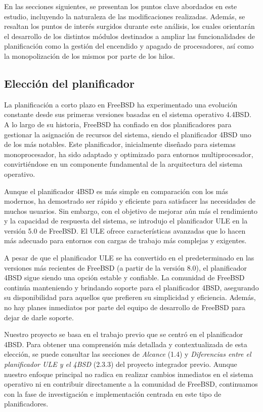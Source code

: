 En las secciones siguientes, se presentan los puntos clave abordados en este estudio, incluyendo la naturaleza de las modificaciones realizadas. Además, se resaltan los puntos de interés surgidos durante este análisis, los cuales orientarán el desarrollo de los distintos módulos destinados a ampliar las funcionalidades de planificación como la gestión del encendido y apagado de procesadores, así como la monopolización de los mismos por parte de los hilos.\par

\subsection{Elección del planificador}

La planificación a corto plazo en FreeBSD ha experimentado una evolución constante desde sus primeras versiones basadas en el sistema operativo 4.4BSD\cite{bib3}. A lo largo de su historia, FreeBSD ha confiado en dos planificadores para gestionar la asignación de recursos del sistema, siendo el planificador 4BSD uno de los más notables. Este planificador, inicialmente diseñado para sistemas monoprocesador, ha sido adaptado y optimizado para entornos multiprocesador, convirtiéndose en un componente fundamental de la arquitectura del sistema operativo.\par

Aunque el planificador 4BSD es más simple en comparación con los más modernos, ha demostrado ser rápido y eficiente para satisfacer las necesidades de muchos usuarios. Sin embargo, con el objetivo de mejorar aún más el rendimiento y la capacidad de respuesta del sistema, se introdujo el planificador ULE en la versión 5.0 de FreeBSD. El ULE ofrece características avanzadas que lo hacen más adecuado para entornos con cargas de trabajo más complejas y exigentes.\par

A pesar de que el planificador ULE se ha convertido en el predeterminado en las versiones más recientes de FreeBSD (a partir de la versión 8.0), el planificador 4BSD sigue siendo una opción estable y confiable. La comunidad de FreeBSD continúa manteniendo y brindando soporte para el planificador 4BSD, asegurando su disponibilidad para aquellos que prefieren su simplicidad y eficiencia. Además, no hay planes inmediatos por parte del equipo de desarrollo de FreeBSD para dejar de darle soporte.\par

Nuestro proyecto se basa en el trabajo previo que se centró en el planificador 4BSD. Para obtener una comprensión más detallada y contextualizada de esta elección, se puede consultar las secciones de \textit{Alcance} (1.4) y  \textit{Diferencias entre el planificador ULE y el 4BSD} (2.3.3) del proyecto integrador previo\cite{bib1}. Aunque nuestro enfoque principal no radica en realizar cambios inmediatos en el sistema operativo ni en contribuir directamente a la comunidad de FreeBSD, continuamos con la fase de investigación e implementación centrada en este tipo de planificadores.\par


